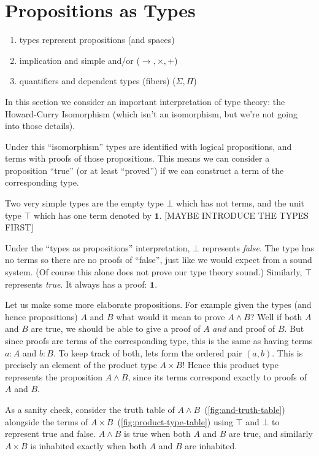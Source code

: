 \section{Propositions as Types}
\begin{enumerate}
  \item types represent propositions (and spaces)
  \item implication and simple and/or ($\rightarrow, \times, +$)
  \item quantifiers and dependent types (fibers) ($\Sigma, \Pi$)
\end{enumerate}

In this section we consider an important interpretation of type theory: the
Howard-Curry Isomorphism (which isn't an isomorphism, but we're not going into
those details).

Under this ``isomorphism'' types are identified with logical propositions, and
terms with proofs of those propositions. This means we can consider a
proposition ``true'' (or at least ``proved'') if we can construct a term of the
corresponding type.

Two very simple types are the empty type $\bot$ which has not terms, and the
unit type $\top$ which has one term denoted by $\mathbf{1}$. [MAYBE INTRODUCE
THE TYPES FIRST]

Under the ``types as propositions'' interpretation, $\bot$ represents
\emph{false}. The type has no terms so there are no proofs of ``false'', just
like we would expect from a sound system. (Of course this alone does not prove
our type theory sound.) Similarly, $\top$ represents \emph{true}. It always has
a proof: $\mathbf{1}$.

Let us make some more elaborate propositions. For example given the types (and
hence propositions) $A$ and $B$ what would it mean to prove $A \land B$? Well if
both $A$ and $B$ are true, we should be able to give a proof of $A$ \emph{and}
and proof of $B$. But since proofs are terms of the corresponding type, this is
the same as having terms $a : A$ and $b : B$. To keep track of both, lets form
the ordered pair $(a, b)$. This is precisely an element of the product type $A
\times B$! Hence this product type represents the proposition $A \land B$, since
its terms correspond exactly to proofs of $A$ and $B$.

As a sanity check, consider the truth table of $A \land B$~(\autoref{fig:and-truth-table}) alongside the terms of $A
\times B$~(\autoref{fig:product-type-table}) using $\top$ and $\bot$ to represent true and false. $A \land B$ is
true when both $A$ and $B$ are true, and similarly $A \times B$ is inhabited
exactly when both $A$ and $B$ are inhabited.

